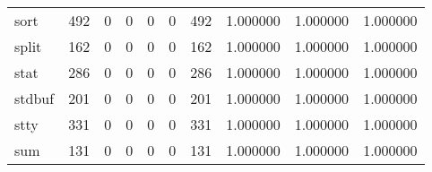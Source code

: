 \begin{tabular}{lrrrrrrrrr}
sort      &                                                492 &                                                  0 &                                                  0 &                                                  0 &                                                  0 &                                                492 &                                           1.000000 &                               1.000000 &                             1.000000 \\
split     &                                                162 &                                                  0 &                                                  0 &                                                  0 &                                                  0 &                                                162 &                                           1.000000 &                               1.000000 &                             1.000000 \\
stat      &                                                286 &                                                  0 &                                                  0 &                                                  0 &                                                  0 &                                                286 &                                           1.000000 &                               1.000000 &                             1.000000 \\
stdbuf    &                                                201 &                                                  0 &                                                  0 &                                                  0 &                                                  0 &                                                201 &                                           1.000000 &                               1.000000 &                             1.000000 \\
stty      &                                                331 &                                                  0 &                                                  0 &                                                  0 &                                                  0 &                                                331 &                                           1.000000 &                               1.000000 &                             1.000000 \\
sum       &                                                131 &                                                  0 &                                                  0 &                                                  0 &                                                  0 &                                                131 &                                           1.000000 &                               1.000000 &                             1.000000 \\

\end{tabular}
